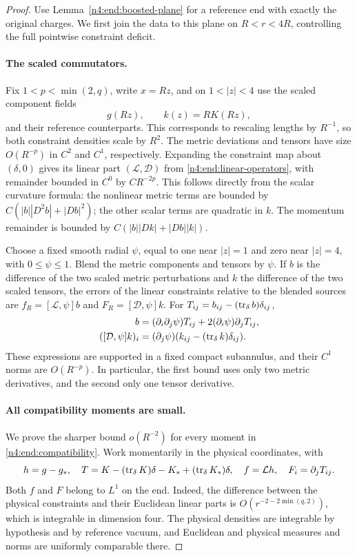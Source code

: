 \begin{proof}
Use Lemma~\ref{n4:end:boosted-plane} for a reference end with exactly the
original charges. We first join the data to this plane on
\(R<r<4R\), controlling the full pointwise constraint deficit.

\paragraph{The scaled commutators.}
Fix \(1<p<\min(2,q)\), write \(x=Rz\), and on
\(1<|z|<4\) use the scaled component fields
\[
 g(Rz),\qquad k(z)=RK(Rz),
\]
and their reference counterparts. This corresponds to rescaling lengths
by \(R^{-1}\), so both constraint densities scale by \(R^2\).
The metric deviations and tensors have size \(O(R^{-p})\) in
\(C^2\) and \(C^1\), respectively. Expanding the constraint map about
\((\delta,0)\) gives its linear part
\((\mathcal L,\mathcal D)\) from \eqref{n4:end:linear-operators}, with
remainder bounded in \(C^0\) by \(CR^{-2p}\). This follows directly
from the scalar curvature formula: the nonlinear metric terms are
bounded by \(C(|b||D^2b|+|Db|^2)\); the other scalar terms are quadratic
in \(k\). The momentum remainder is bounded by
\(C(|b||Dk|+|Db||k|)\).

Choose a fixed smooth radial \(\psi\), equal to one near \(|z|=1\)
and zero near \(|z|=4\), with \(0\le\psi\le1\). Blend the metric
components and tensors by \(\psi\). If \(b\) is the difference of
the two scaled metric perturbations and \(k\) the difference of the
two scaled tensors, the errors of the linear constraints relative to
the blended sources are
\(f_R=[\mathcal L,\psi]b\) and
\(F_R=[\mathcal D,\psi]k\). For \(T_{ij}=b_{ij}-(\operatorname{tr}_\delta b)\delta_{ij}\),
\begin{align}
 [\mathcal L,\psi]b
   &=(\partial_i\partial_j\psi)T_{ij}
       +2(\partial_i\psi)\partial_jT_{ij},\label{n4:end:scalar-commutator}\\
 ([\mathcal D,\psi]k)_i
   &=(\partial_j\psi)(k_{ij}-(\tr_\delta k)\delta_{ij}).
       \label{n4:end:vector-commutator}
\end{align}
These expressions are supported in a fixed compact subannulus, and
their \(C^1\) norms are \(O(R^{-p})\). In particular, the first bound
uses only two metric derivatives, and the second only one tensor
derivative.

\paragraph{All compatibility moments are small.}
We prove the sharper bound \(o(R^{-2})\) for every moment in
\eqref{n4:end:compatibility}. Work momentarily in the physical coordinates,
with
\[
 h=g-g_*,\quad
 T=K-(\operatorname{tr}_\delta K)\delta-K_*+(\operatorname{tr}_\delta K_*)\delta,
 \quad f=\mathcal Lh,\quad F_i=\partial_jT_{ij}.
\]
Both \(f\) and \(F\) belong to \(L^1\) on the end. Indeed, the
difference between the physical constraints and their Euclidean linear
parts is \(O(r^{-2-2\min(q,2)})\), which is integrable in dimension
four. The physical densities are integrable by hypothesis and by
reference vacuum, and Euclidean and physical measures and norms are
uniformly comparable there.


\end{proof}
